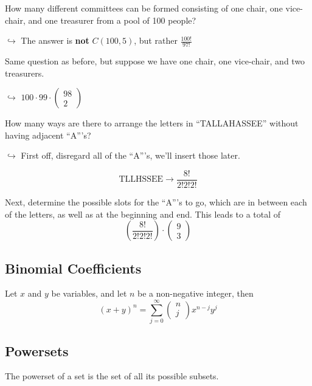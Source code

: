     \begin{ex}
        How many different committees can be formed consisting of one chair, one vice-chair, and one treasurer from a pool of 100 people?

        $\hookrightarrow$ The answer is \textbf{not} $C(100, 5)$, but rather $\frac{100!}{97!}$
    \end{ex}

    \begin{ex}
        Same question as before, but suppose we have one chair, one vice-chair, and two treasurers.

        $\hookrightarrow$ $100 \cdot 99 \cdot \begin{pmatrix}98\\2\end{pmatrix}$
    \end{ex}

    \begin{ex}
        How many ways are there to arrange the letters in ``TALLAHASSEE'' without having adjacent ``A'''s?

        $\hookrightarrow$ First off, disregard all of the ``A'''s, we'll insert those later.

            \[
                \text{TLLHSSEE} \to \frac{8!}{2!2!2!}
            \]

        Next, determine the possible slots for the ``A'''s to go, which are in between each of the letters, as well as at the beginning and end. This leads to a total of
        \[
            \left( \frac{8!}{2!2!2!} \right) \cdot \begin{pmatrix}9\\3\end{pmatrix}
        \]
    \end{ex}

    \subsection{Binomial Coefficients}
    \begin{thm}
        Let $x$ and $y$ be variables, and let $n$ be a non-negative integer, then
            \[
                {(x + y)}^n = \sum^\infty_{j=0} \begin{pmatrix}n\\j\end{pmatrix} x^{n - j} y^j
            \]
    \end{thm}

    \subsection{Powersets}
    The powerset of a set is the set of all its possible subsets.

